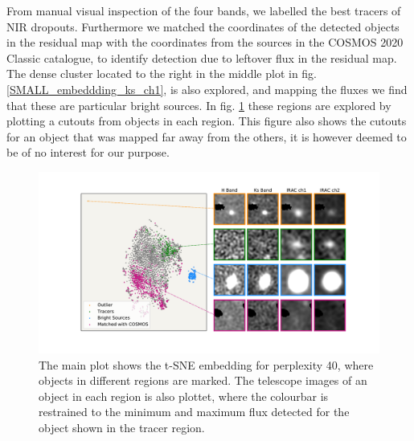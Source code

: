 From manual visual inspection of the four bands, we labelled the best tracers of NIR dropouts. Furthermore we matched the coordinates of the detected objects in the residual map with the coordinates from the sources in the COSMOS 2020 Classic catalogue, to identify detection due to leftover flux in the residual map. The dense cluster located to the right in the middle plot in fig. \ref{SMALL_embeddding_ks_ch1}, is also explored, and mapping the fluxes we find that these are particular bright sources. In fig. \ref{embedding_regions} these regions are explored by plotting a cutouts from objects in each region. This figure also shows the cutouts for an object that was mapped far away from the others, it is however deemed to be of no interest for our purpose.

\begin{figure}[]
    \centering %
    \includegraphics[trim={0cm 0cm 0cm 0cm},clip,width=\textwidth]{Code/Saved_Figures/Visual_inspection_embedding.pdf}
    \caption{The main plot shows the t-SNE embedding for perplexity 40, where objects in different regions are marked. The telescope images of an object in each region is also plottet, where the colourbar is restrained to the minimum and maximum flux detected for the object shown in the tracer region.}
    \label{embedding_regions}
\end{figure}

